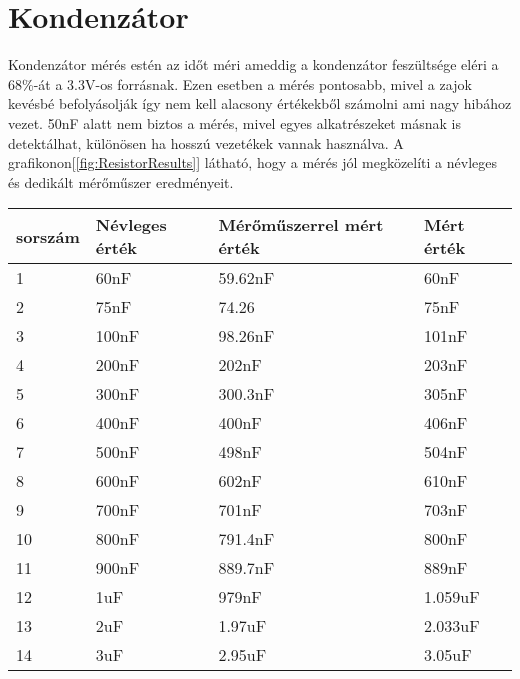 \section{Kondenzátor}

Kondenzátor mérés estén az időt méri ameddig a kondenzátor feszültsége eléri a 
68\%-át a 3.3V-os forrásnak. Ezen esetben a mérés pontosabb, mivel
a zajok kevésbé befolyásolják így nem kell alacsony értékekből
számolni ami nagy hibához vezet. 50nF alatt nem biztos a mérés, 
mivel egyes alkatrészeket másnak is detektálhat, különösen ha 
hosszú vezetékek vannak használva. A grafikonon[\ref{fig:ResistorResults}]
látható, hogy a mérés jól megközelíti a névleges és dedikált mérőműszer
eredményeit.

\begin{table}[H]
    \begin{tabular}{|l|l|l|l|}
    \hline
    sorszám & Névleges érték & Mérőműszerrel mért érték & Mért érték \\ \hline
    1       & 60nF           & 59.62nF                  & 60nF       \\ \hline
    2       & 75nF           & 74.26                    & 75nF       \\ \hline
    3       & 100nF          & 98.26nF                  & 101nF      \\ \hline
    4       & 200nF          & 202nF                    & 203nF      \\ \hline
    5       & 300nF          & 300.3nF                  & 305nF      \\ \hline
    6       & 400nF          & 400nF                    & 406nF      \\ \hline
    7       & 500nF          & 498nF                    & 504nF      \\ \hline
    8       & 600nF          & 602nF                    & 610nF      \\ \hline
    9       & 700nF          & 701nF                    & 703nF      \\ \hline
    10      & 800nF          & 791.4nF                  & 800nF      \\ \hline
    11      & 900nF          & 889.7nF                  & 889nF      \\ \hline
    12      & 1uF            & 979nF                    & 1.059uF    \\ \hline
    13      & 2uF            & 1.97uF                   & 2.033uF    \\ \hline
    14      & 3uF            & 2.95uF                   & 3.05uF     \\ \hline

\end{tabular}
\end{table}
